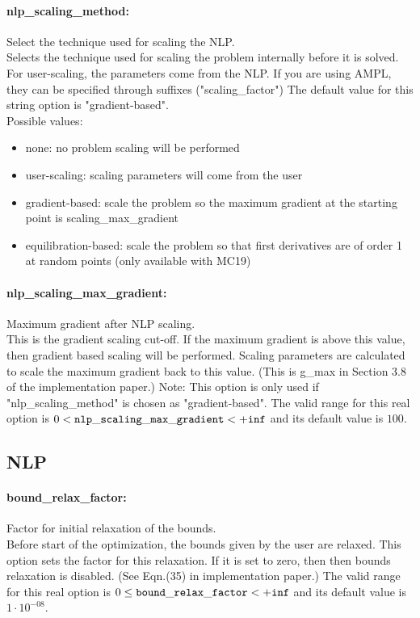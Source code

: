 \paragraph{nlp\_scaling\_method:}\label{sec:nlp_scaling_method} Select the technique used for scaling the NLP. $\;$ \\
 Selects the technique used for scaling the
problem internally before it is solved. For
user-scaling, the parameters come from the NLP.
If you are using AMPL, they can be specified
through suffixes ("scaling\_factor")
The default value for this string option is "gradient-based".
\\ 
Possible values:
\begin{itemize}
   \item none: no problem scaling will be performed
   \item user-scaling: scaling parameters will come from the user
   \item gradient-based: scale the problem so the maximum gradient at
the starting point is scaling\_max\_gradient
   \item equilibration-based: scale the problem so that first derivatives are
of order 1 at random points (only available
with MC19)
\end{itemize}

\paragraph{nlp\_scaling\_max\_gradient:}\label{sec:nlp_scaling_max_gradient} Maximum gradient after NLP scaling. $\;$ \\
 This is the gradient scaling cut-off. If the
maximum gradient is above this value, then
gradient based scaling will be performed. Scaling
parameters are calculated to scale the maximum
gradient back to this value. (This is g\_max in
Section 3.8 of the implementation paper.) Note:
This option is only used if
"nlp\_scaling\_method" is chosen as
"gradient-based". The valid range for this real option is 
$0 <  {\tt nlp\_scaling\_max\_gradient } <  {\tt +inf}$
and its default value is $100$.


\subsection{NLP}

\paragraph{bound\_relax\_factor:}\label{sec:bound_relax_factor} Factor for initial relaxation of the bounds. $\;$ \\
 Before start of the optimization, the bounds
given by the user are relaxed.  This option sets
the factor for this relaxation.  If it is set to
zero, then then bounds relaxation is disabled.
(See Eqn.(35) in implementation paper.) The valid range for this real option is 
$0 \le {\tt bound\_relax\_factor } <  {\tt +inf}$
and its default value is $1 \cdot 10^{-08}$.



